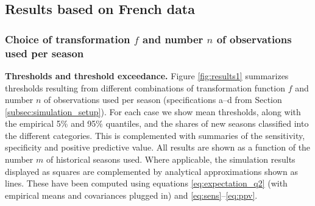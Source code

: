 \documentclass{article}
\begin{document}
\subsection{Results based on French data}

\subsubsection{Choice of transformation $f$ and number $n$ of observations used per season}
\label{subsubsec:n}

\textbf{Thresholds and threshold exceedance.} Figure \ref{fig:results1} summarizes thresholds resulting from different combinations of transformation function $f$ and number $n$ of observations used per season (specifications a--d from Section \ref{subsec:simulation_setup}). For each case we show mean thresholds, along with the empirical 5\% and 95\% quantiles, and the shares of new seasons classified into the different categories. This is complemented with summaries of the sensitivity, specificity and positive predictive value. All results are shown as a function of the number $m$ of historical seasons used. Where applicable, the simulation results displayed as squares are complemented by analytical approximations shown as lines. These have been computed using equations \eqref{eq:expectation_q2} (with empirical means and covariances plugged in) and \eqref{eq:sens}--\eqref{eq:ppv}.
\end{document}
